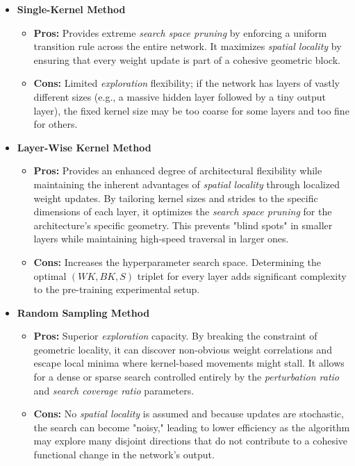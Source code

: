 \begin{itemize}
    \item \textbf{Single-Kernel Method}
    \begin{itemize}
        \item \textbf{Pros:} Provides extreme \textit{search space pruning} by enforcing a uniform transition rule across the entire network. It maximizes \textit{spatial locality} by ensuring that every weight update is part of a cohesive geometric block.
        \item \textbf{Cons:} Limited \textit{exploration} flexibility; if the network has layers of vastly different sizes (e.g., a massive hidden layer followed by a tiny output layer), the fixed kernel size may be too coarse for some layers and too fine for others.
    \end{itemize}

    \item \textbf{Layer-Wise Kernel Method}
    \begin{itemize}
        \item \textbf{Pros:} Provides an enhanced degree of architectural flexibility while maintaining the inherent advantages of \textit{spatial locality} through localized weight updates. By tailoring kernel sizes and strides to the specific dimensions of each layer, it optimizes the \textit{search space pruning} for the architecture's specific geometry. This prevents "blind spots" in smaller layers while maintaining high-speed traversal in larger ones.
        \item \textbf{Cons:} Increases the hyperparameter search space. Determining the optimal $(WK, BK, S)$ triplet for every layer adds significant complexity to the pre-training experimental setup.
    \end{itemize}

    \item \textbf{Random Sampling Method}
    \begin{itemize}
        \item \textbf{Pros:} Superior \textit{exploration} capacity. By breaking the constraint of geometric locality, it can discover non-obvious weight correlations and escape local minima where kernel-based movements might stall. It allows for a dense or sparse search controlled entirely by the \textit{perturbation ratio} and \textit{search coverage ratio} parameters.
        \item \textbf{Cons:} No \textit{spatial locality} is assumed and because updates are stochastic, the search can become "noisy," leading to lower efficiency as the algorithm may explore many disjoint directions that do not contribute to a cohesive functional change in the network's output.
    \end{itemize}
\end{itemize}

